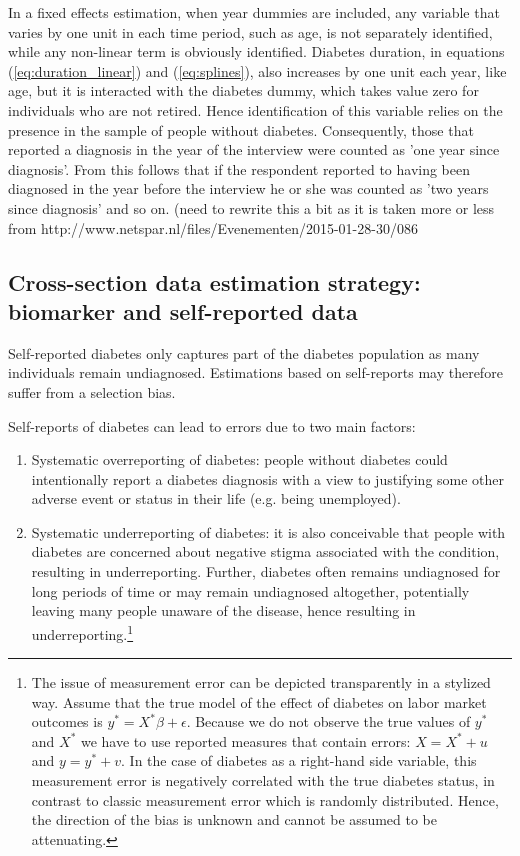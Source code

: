 \documentclass[12pt,english,british]{article}
\begin{document}
In a fixed effects estimation, when year dummies are included, any variable that varies by one
unit in each time period, such as age, is not separately identified, while any non-linear term is obviously identified. Diabetes duration, in equations (\ref{eq:duration_linear}) and (\ref{eq:splines}), also increases by one unit each
year, like age, but it is interacted with the diabetes dummy, which takes value zero for individuals
who are not retired. Hence identification of this variable relies on the presence in the sample of people without diabetes. Consequently, those that reported a diagnosis in the year of the interview were counted as 'one year since diagnosis'. From this follows that if the respondent reported to having been diagnosed in the year before the interview he or she was counted as 'two years since diagnosis' and so on. (need to rewrite this a bit as it is taken more or less from http://www.netspar.nl/files/Evenementen/2015-01-28-30/086%



\subsection{Cross-section data estimation strategy: biomarker and self-reported data}

Self-reported diabetes only captures part of the diabetes population as many individuals remain undiagnosed.  Estimations based on self-reports may therefore suffer from a selection bias.

Self-reports of diabetes can lead to errors due to two main factors: 
\begin{enumerate}
\item Systematic overreporting of diabetes: people without diabetes
could intentionally report a diabetes diagnosis with a view to justifying
some other adverse event or status in their life (e.g. being unemployed). 
\item Systematic underreporting of diabetes: it is also conceivable
that people with diabetes are concerned about negative stigma associated with the condition, resulting in underreporting. Further, diabetes often remains
undiagnosed for long periods of time or may remain undiagnosed altogether, potentially
leaving many people unaware of the disease, hence resulting in
underreporting.\footnote{The issue of measurement error can be depicted transparently in a stylized way. Assume that the true model of the effect of diabetes on labor market outcomes is $y^{*}=X^{*}\beta+\epsilon$. Because we do not observe the true values of $y^{*}$ and $X^{*}$  we have to use reported measures that contain errors: $X=X^{*} + u$ and $y=y^{*} + v$. In the case of diabetes as a right-hand side variable, this measurement error is negatively correlated with the true diabetes status, in contrast to classic measurement error which is randomly distributed. Hence, the direction of the bias is unknown and cannot be assumed to be attenuating.}

\end{enumerate} 
\end{document}
